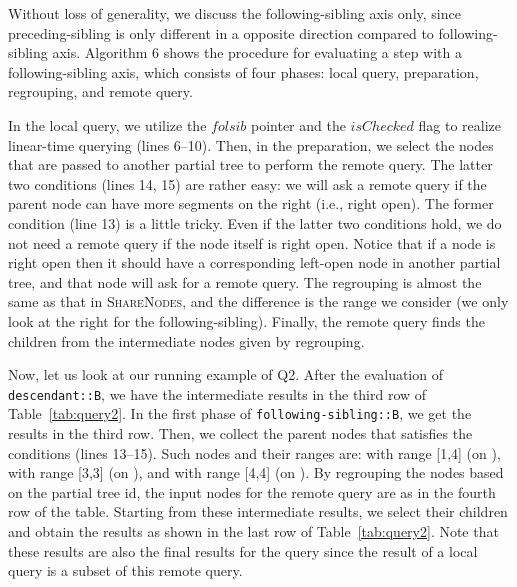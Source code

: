 Without loss of generality, we discuss the following-sibling axis only, since
preceding-sibling is only different in a opposite direction compared to
following-sibling axis. Algorithm 6 shows the procedure for evaluating a step
with a following-sibling axis, which consists of four phases: local query,
preparation, regrouping, and remote query.

In the local query, we utilize the $\mathit{folsib}$ pointer and the
$\mathit{isChecked}$ flag to realize linear-time querying (lines 6--10). Then,
in the preparation, we select the nodes that are passed to another partial tree
to perform the remote query.  The latter two conditions (lines 14, 15) are
rather easy: we will ask a remote query if the parent node can have more
segments on the right (i.e., right open). The former condition (line 13) is a
little tricky.  Even if the latter two conditions hold, we do not need a remote
query if the node itself is right open.  Notice that if a node is right open
then it should have a corresponding left-open node in another partial tree, and
that node will ask for a remote query.  The regrouping is almost the same as
that in \textsc{ShareNodes}, and the difference is the range we consider (we
only look at the right for the following-sibling). Finally, the remote query
finds the children from the intermediate nodes given by regrouping.

Now, let us look at our running example of Q2. After the evaluation of
\texttt{descendant::B}, we have the intermediate results in the third row of
Table~\ref{tab:query2}. In the first phase of \texttt{following-sibling::B}, we get
the results in the third row. Then, we collect the parent nodes that satisfies
the conditions (lines 13--15). Such nodes and their ranges are:  with
range [1,4] (on ),  with range [3,3] (on ), and  with
range [4,4] (on ). By regrouping the nodes based on the partial tree id, the
input nodes for the remote query are as in the fourth row of the table. Starting
from these intermediate results, we select their children and obtain the results
as shown in the last row of Table~\ref{tab:query2}. Note that these results are also
the final results for the query since the result of a local query is a subset of
this remote query.


